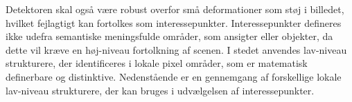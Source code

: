 Detektoren skal også være robust overfor små deformationer som støj i billedet, hvilket fejlagtigt kan fortolkes som interessepunkter. Interessepunkter defineres ikke udefra semantiske meningsfulde områder, som ansigter eller objekter, da dette vil kræve en høj-niveau fortolkning af scenen. I stedet anvendes lav-niveau strukturere, der identificeres i lokale pixel områder, som er matematisk definerbare og distinktive. Nedenstående er en gennemgang af forskellige lokale lav-niveau strukturere, der kan bruges i udvælgelsen af interessepunkter.


